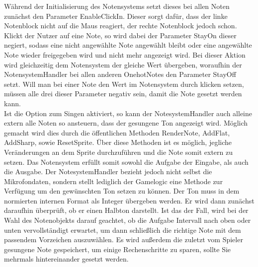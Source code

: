 Während der Initialisierung des Notensystems setzt dieses bei allen Noten zunächst den Parameter EnableClickIn. Dieser sorgt dafür, dass der linke Notenblock nicht auf die Maus reagiert, der rechte Notenblock jedoch schon. Klickt der Nutzer auf eine Note, so wird dabei der Parameter StayOn dieser negiert, sodass eine nicht angewählte Note angewählt bleibt oder eine angewählte Note wieder freigegeben wird und nicht mehr angezeigt wird. Bei dieser Aktion wird gleichzeitig dem Notensystem der gleiche Wert übergeben, woraufhin der NotensystemHandler bei allen anderen OnehotNotes den Parameter StayOff setzt. Will man bei einer Note den Wert im Notensystem durch klicken setzen, müssen alle drei dieser Parameter negativ sein, damit die Note gesetzt werden kann. \\
Ist die Option zum Singen aktiviert, so kann der NotesystemHandler auch alleine extern alle Noten so ansteuern, dass der gesungene Ton angezeigt wird. Möglich gemacht wird dies durch die öffentlichen Methoden RenderNote, AddFlat, AddSharp, sowie ResetSprite. Über diese Methoden ist es möglich, jegliche Veränderungen an dem Sprite durchzuführen und die Note somit extern zu setzen. Das Notensystem erfüllt somit sowohl die Aufgabe der Eingabe, als auch die Ausgabe. Der NotesystemHandler bezieht jedoch nicht selbst die Mikrofondaten, sondern stellt lediglich der Gamelogic eine Methode zur Verfügung um den gewünschten Ton setzen zu können. Der Ton muss in dem normierten internen Format als Integer übergeben werden. Er wird dann zunächst daraufhin überprüft, ob er einen Halbton darstellt. Ist das der Fall, wird bei der Wahl des Notenobjekts darauf geachtet, ob die Aufgabe Intervall nach oben oder unten vervollständigt erwartet, um dann schließlich die richtige Note mit dem passendem Vorzeichen auszuwählen. Es wird außerdem die zuletzt vom Spieler gesungene Note gespeichert, um einige Rechenschritte zu sparen, sollte Sie mehrmals hintereinander gesetzt werden. 


